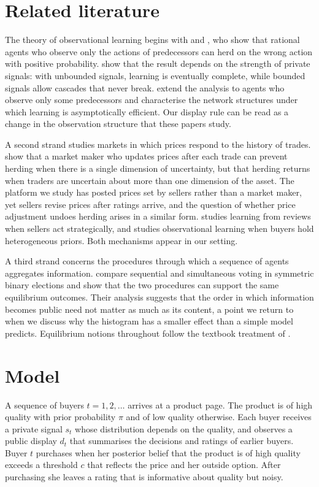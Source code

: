 \documentclass[12pt]{article}
\begin{document}
\section{Related literature}
The theory of observational learning begins with \citet{banerjee1992} and \citet{bikhchandani1992}, who show that rational agents who observe only the actions of predecessors can herd on the wrong action with positive probability. \citet{smith2000} show that the result depends on the strength of private signals: with unbounded signals, learning is eventually complete, while bounded signals allow cascades that never break. \citet{acemoglu2011} extend the analysis to agents who observe only some predecessors and characterise the network structures under which learning is asymptotically efficient. Our display rule can be read as a change in the observation structure that these papers study.

A second strand studies markets in which prices respond to the history of trades. \citet{avery1998} show that a market maker who updates prices after each trade can prevent herding when there is a single dimension of uncertainty, but that herding returns when traders are uncertain about more than one dimension of the asset. The platform we study has posted prices set by sellers rather than a market maker, yet sellers revise prices after ratings arrive, and the question of whether price adjustment undoes herding arises in a similar form. \citet{kogan2020} studies learning from reviews when sellers act strategically, and \citet{lee2021} studies observational learning when buyers hold heterogeneous priors. Both mechanisms appear in our setting.

A third strand concerns the procedures through which a sequence of agents aggregates information. \citet{dekel2000} compare sequential and simultaneous voting in symmetric binary elections and show that the two procedures can support the same equilibrium outcomes. Their analysis suggests that the order in which information becomes public need not matter as much as its content, a point we return to when we discuss why the histogram has a smaller effect than a simple model predicts. Equilibrium notions throughout follow the textbook treatment of \citet{osborne1994}.

\section{Model}
A sequence of buyers $t = 1, 2, \ldots$ arrives at a product page. The product is of high quality with prior probability $\pi$ and of low quality otherwise. Each buyer receives a private signal $s_t$ whose distribution depends on the quality, and observes a public display $d_t$ that summarises the decisions and ratings of earlier buyers. Buyer $t$ purchases when her posterior belief that the product is of high quality exceeds a threshold $c$ that reflects the price and her outside option. After purchasing she leaves a rating that is informative about quality but noisy.
\end{document}
